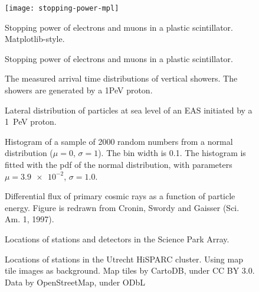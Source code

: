 \documentclass[a4paper,11pt]{article}
\begin{document}
\begin{figure}
\centering
\texttt{[image: stopping-power-mpl]}
\caption{Stopping power of electrons and muons in a plastic scintillator.
Matplotlib-style.}
\end{figure}

\begin{figure}
\centering

\caption{Stopping power of electrons and muons in a plastic scintillator.}
\end{figure}

\begin{figure}
\centering
{
}
\caption{The measured arrival time distributions of vertical showers. The
showers are generated by a 1PeV proton.}
\end{figure}

\begin{figure}
\centering

\caption{Lateral distribution of particles at sea level of an EAS
initiated by a \SI{1}{\peta\electronvolt} proton.}
\end{figure}

\begin{figure}
\centering

\caption{Histogram of a sample of \num{2000} random numbers from a normal
distribution ($\mu = 0$, $\sigma = 1$).  The bin width is \num{.1}.  The
histogram is fitted with the pdf of the normal distribution, with
parameters $\mu = \num{3.9e-2}$, $\sigma=\num{1.0}$.}
\end{figure}

\begin{figure}
\centering

\caption{Differential flux of primary cosmic rays as a function of
particle energy.  Figure is redrawn from Cronin, Swordy and Gaisser (Sci.
Am. 1, 1997).}
\end{figure}

\begin{figure}
\centering
{
}
\caption{Locations of stations and detectors in the Science Park Array.}
\end{figure}

\begin{figure}
\centering

\caption{Locations of stations in the Utrecht HiSPARC cluster.
         Using map tile images as background. Map tiles by CartoDB,
         under CC BY 3.0. Data by OpenStreetMap, under ODbL}
\end{figure}
\end{document}
